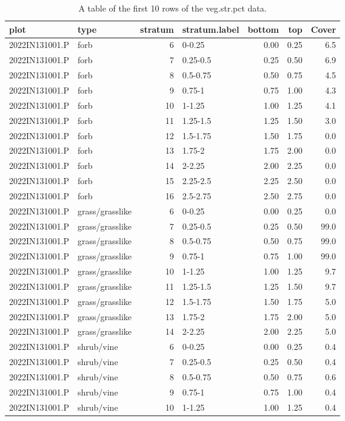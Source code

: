 \documentclass[
]{book}
\begin{document}
\begin{table}

\caption{\label{tab:unnamed-chunk-1}A table of the first 10 rows of the veg.str.pct data.}
\centering
\begin{tabular}[t]{llrlrrr}
\toprule
plot & type & stratum & stratum.label & bottom & top & Cover\\
\midrule
2022IN131001.P & forb & 6 & 0-0.25 & 0.00 & 0.25 & 6.5\\
2022IN131001.P & forb & 7 & 0.25-0.5 & 0.25 & 0.50 & 6.9\\
2022IN131001.P & forb & 8 & 0.5-0.75 & 0.50 & 0.75 & 4.5\\
2022IN131001.P & forb & 9 & 0.75-1 & 0.75 & 1.00 & 4.3\\
2022IN131001.P & forb & 10 & 1-1.25 & 1.00 & 1.25 & 4.1\\
\addlinespace
2022IN131001.P & forb & 11 & 1.25-1.5 & 1.25 & 1.50 & 3.0\\
2022IN131001.P & forb & 12 & 1.5-1.75 & 1.50 & 1.75 & 0.0\\
2022IN131001.P & forb & 13 & 1.75-2 & 1.75 & 2.00 & 0.0\\
2022IN131001.P & forb & 14 & 2-2.25 & 2.00 & 2.25 & 0.0\\
2022IN131001.P & forb & 15 & 2.25-2.5 & 2.25 & 2.50 & 0.0\\
\addlinespace
2022IN131001.P & forb & 16 & 2.5-2.75 & 2.50 & 2.75 & 0.0\\
2022IN131001.P & grass/grasslike & 6 & 0-0.25 & 0.00 & 0.25 & 0.0\\
2022IN131001.P & grass/grasslike & 7 & 0.25-0.5 & 0.25 & 0.50 & 99.0\\
2022IN131001.P & grass/grasslike & 8 & 0.5-0.75 & 0.50 & 0.75 & 99.0\\
2022IN131001.P & grass/grasslike & 9 & 0.75-1 & 0.75 & 1.00 & 99.0\\
\addlinespace
2022IN131001.P & grass/grasslike & 10 & 1-1.25 & 1.00 & 1.25 & 9.7\\
2022IN131001.P & grass/grasslike & 11 & 1.25-1.5 & 1.25 & 1.50 & 9.7\\
2022IN131001.P & grass/grasslike & 12 & 1.5-1.75 & 1.50 & 1.75 & 5.0\\
2022IN131001.P & grass/grasslike & 13 & 1.75-2 & 1.75 & 2.00 & 5.0\\
2022IN131001.P & grass/grasslike & 14 & 2-2.25 & 2.00 & 2.25 & 5.0\\
\addlinespace
2022IN131001.P & shrub/vine & 6 & 0-0.25 & 0.00 & 0.25 & 0.4\\
2022IN131001.P & shrub/vine & 7 & 0.25-0.5 & 0.25 & 0.50 & 0.4\\
2022IN131001.P & shrub/vine & 8 & 0.5-0.75 & 0.50 & 0.75 & 0.6\\
2022IN131001.P & shrub/vine & 9 & 0.75-1 & 0.75 & 1.00 & 0.4\\
2022IN131001.P & shrub/vine & 10 & 1-1.25 & 1.00 & 1.25 & 0.4\\
\bottomrule
\end{tabular}
\end{table}
\end{document}
